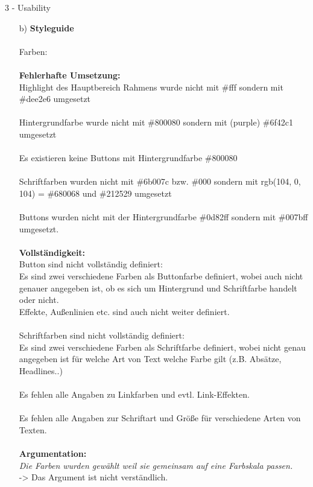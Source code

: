 \documentclass[a4paper]{article}
\begin{document}
\begin{exercise}{3 - Usability}
\begin{itemize}
\item[b)]\textbf{Styleguide}\\\\
{\Large Farben:}\\\\
\textbf{Fehlerhafte Umsetzung:}\\
Highlight des Hauptbereich Rahmens wurde nicht mit \#fff sondern mit \#dee2e6 umgesetzt\\\\
Hintergrundfarbe wurde nicht mit \#800080 sondern mit (purple) \#6f42c1 umgesetzt\\\\
Es existieren keine Buttons mit Hintergrundfarbe \#800080 \\\\
Schriftfarben wurden nicht mit \#6b007c bzw. \#000 sondern mit rgb(104, 0, 104) = \#680068 und \#212529 umgesetzt\\\\
Buttons wurden nicht mit der Hintergrundfarbe \#0d82ff sondern mit \#007bff umgesetzt.\\\\
\textbf{Vollständigkeit:}\\
Button sind nicht vollständig definiert:\\
Es sind zwei verschiedene Farben als Buttonfarbe definiert, wobei auch nicht genauer angegeben ist, ob es sich um Hintergrund und Schriftfarbe handelt oder nicht.\\
Effekte, Außenlinien etc. sind auch nicht weiter definiert.\\\\
Schriftfarben sind nicht vollständig definiert:\\
Es sind zwei verschiedene Farben als Schriftfarbe definiert, wobei nicht genau angegeben ist für welche Art von Text welche Farbe gilt (z.B. Absätze, Headlines..)\\\\
Es fehlen alle Angaben zu Linkfarben und evtl. Link-Effekten.\\\\
Es fehlen alle Angaben zur Schriftart und Größe für verschiedene Arten von Texten.\\\\
\textbf{Argumentation:}\\
\textit{Die Farben wurden gewählt weil sie gemeinsam auf eine Farbskala passen.}\\
-> Das Argument ist nicht verständlich.\\\\

\end{itemize}
\end{exercise}
\end{document}
